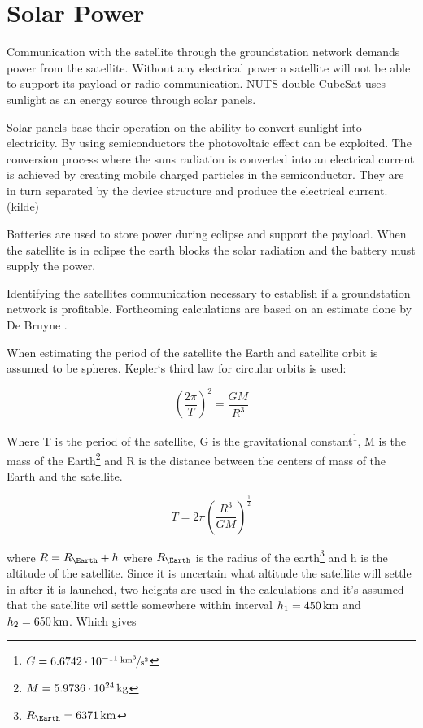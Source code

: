 \section{Solar Power}

Communication with the satellite through the groundstation network demands power from the satellite. Without any electrical power a satellite will not be able to support its payload or radio communication. NUTS double CubeSat uses sunlight as an energy source through solar panels. 

Solar panels base their operation on the ability to convert sunlight into electricity. By using semiconductors the photovoltaic effect can be exploited. The conversion process where the suns radiation is converted into an electrical current is achieved by creating mobile charged particles in the semiconductor. They are in turn separated by the device structure and produce the electrical current.(kilde) 

Batteries are used to store power during eclipse and support the payload. When the satellite is in eclipse the earth blocks the solar radiation and the battery must supply the power.

Identifying the satellites communication necessary to establish if a groundstation network is profitable. Forthcoming calculations are based on an estimate done by De Bruyne \cite{Satellite Power Systems}.

When estimating the period of the satellite the Earth and satellite orbit is assumed to be spheres. Kepler`s third law for circular orbits is used:

\begin{equation}
\left(\frac{2\pi}{T}\right)^2 = \frac{GM}{R^3}
\label{eq:Keplers_3}
\end{equation}

Where T is the period of the satellite, G is the gravitational constant\footnote{$G=\unitfrac[6.6742\cdot 10^{-11}]{km^3}{s^2}$}, M is the mass of the Earth\footnote{$M=\unit[5.9736\cdot 10^{24}]{kg}$} and R is the distance between the centers of mass of the Earth and the satellite.

\begin{equation}
T = 2\pi \left(\frac{R^3}{GM}\right)^{\frac{1}{2}}
\label{eq:satellite_period}
\end{equation}

where $R = R_\Earth + h$ where $R_\Earth$ is the radius of the earth\footnote{$R_\Earth = \unit[6371]{km}$} and h is the altitude of the satellite. 
Since it is uncertain what altitude the satellite will settle in after it is launched, two heights are used in the calculations and it's assumed that the satellite wil settle somewhere within interval $h_1=\unit[450]{km}$ and $h_2=\unit[650]{km}$. 
Which gives


